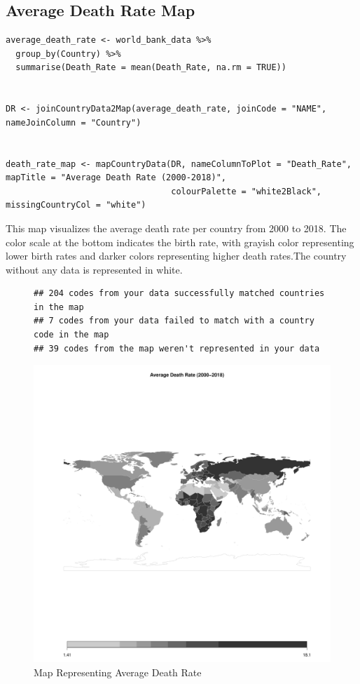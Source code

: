 \documentclass{article}\usepackage[]{graphicx}\usepackage[]{xcolor}
\makeatletter
\def\maxwidth{ %
  \ifdim\Gin@nat@width>\linewidth
    \linewidth
  \else
    \Gin@nat@width
  \fi
}
\newenvironment{kframe}{%
 \def\at@end@of@kframe{}%
 \ifinner\ifhmode%
  \def\at@end@of@kframe{\end{minipage}}%
  \begin{minipage}{\columnwidth}%
 \fi\fi%
 \def\FrameCommand##1{\hskip\@totalleftmargin \hskip-\fboxsep
 \colorbox{shadecolor}{##1}\hskip-\fboxsep
     \hskip-\linewidth \hskip-\@totalleftmargin \hskip\columnwidth}%
 \MakeFramed {\advance\hsize-\width
   \@totalleftmargin\z@ \linewidth\hsize
   \@setminipage}}%
 {\par\unskip\endMakeFramed%
 \at@end@of@kframe}
\newenvironment{knitrout}{}{} %
\makeatother
\begin{document}
\subsection{Average Death Rate Map}
\begin{lstlisting}
average_death_rate <- world_bank_data %>%
  group_by(Country) %>%
  summarise(Death_Rate = mean(Death_Rate, na.rm = TRUE))


DR <- joinCountryData2Map(average_death_rate, joinCode = "NAME", nameJoinColumn = "Country")


death_rate_map <- mapCountryData(DR, nameColumnToPlot = "Death_Rate", mapTitle = "Average Death Rate (2000-2018)", 
                                 colourPalette = "white2Black", missingCountryCol = "white")

\end{lstlisting}
This map visualizes the average death rate per country from 2000 to 2018. The color scale at the bottom indicates the birth rate, with grayish color representing lower birth rates and darker colors representing higher death rates.The country without any data is represented in white.
\newpage
\begin{figure}[h!]

\centering
\begin{knitrout}
\color{fgcolor}\begin{kframe}
\begin{verbatim}
## 204 codes from your data successfully matched countries in the map
## 7 codes from your data failed to match with a country code in the map
## 39 codes from the map weren't represented in your data
\end{verbatim}
\end{kframe}
\includegraphics[width=\maxwidth]{figure/unnamed-chunk-17-1} 
\end{knitrout}
\caption{Map Representing Average Death Rate}

\label{fig}
\end{figure}
\end{document}
